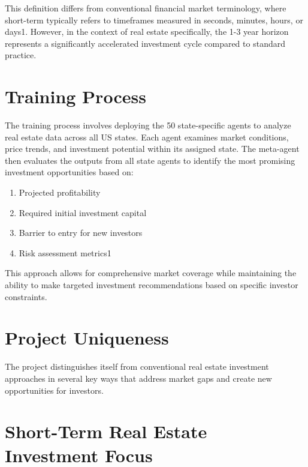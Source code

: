 This definition differs from conventional financial market terminology, where short-term typically refers to timeframes measured in seconds, minutes, hours, or days1. However, in the context of real estate specifically, the 1-3 year horizon represents a significantly accelerated investment cycle compared to standard practice.


\section*{Training Process}

The training process involves deploying the 50 state-specific agents to analyze real estate data across all US states. Each agent examines market conditions, price trends, and investment potential within its assigned state. The meta-agent then evaluates the outputs from all state agents to identify the most promising investment opportunities based on:


\begin{enumerate}

\item
Projected profitability




\item
Required initial investment capital




\item
Barrier to entry for new investors




\item
Risk assessment metrics1




\end{enumerate}

This approach allows for comprehensive market coverage while maintaining the ability to make targeted investment recommendations based on specific investor constraints.


\section*{Project Uniqueness}

The project distinguishes itself from conventional real estate investment approaches in several key ways that address market gaps and create new opportunities for investors.


\section*{Short-Term Real Estate Investment Focus}

